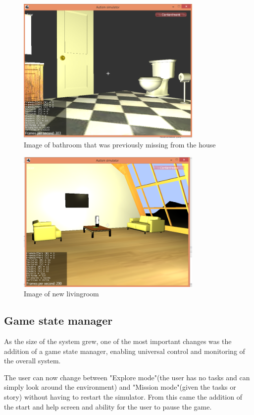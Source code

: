 \begin{figure}[H]
\centering
\includegraphics[width=90mm]{images/new_bathroom.png}
\caption{Image of bathroom that was previously missing from the house}
\label{old_house}
\end{figure}

\begin{figure}[H]
\centering
\includegraphics[width=90mm]{images/new_livingroom.png}
\caption{Image of new livingroom}
\label{old_house}
\end{figure}

\subsection{Game state manager}

As the size of the system grew, one of the most important changes was the addition of a game state manager, enabling universal control and monitoring of the overall system. 

The user can now change between "Explore mode"(the user has no tasks and can simply look around the environment) and "Mission mode"(given the tasks or story) without having to restart the simulator. From this came the addition of the start and help screen and ability for the user to pause the game.  

